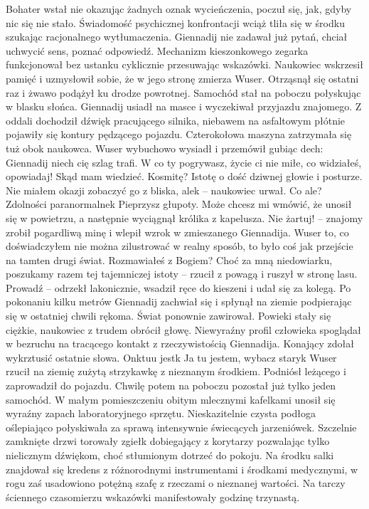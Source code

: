 \documentclass[../MAIN.tex]{subfiles}
\begin{document}
Bohater wstał nie okazując żadnych oznak wycieńczenia, poczuł się, jak, gdyby nic się nie stało. Świadomość psychicznej konfrontacji wciąż tliła się w środku szukając racjonalnego wytłumaczenia. Giennadij nie zadawał już pytań, chciał uchwycić sens, poznać odpowiedź. Mechanizm kieszonkowego zegarka funkcjonował bez ustanku cyklicznie przesuwając wskazówki. Naukowiec wskrzesił pamięć 
i uzmysłowił sobie, że w jego stronę zmierza Wuser. Otrząsnął się ostatni raz i żwawo podążył ku drodze powrotnej. Samochód stał na poboczu połyskując w blasku słońca. Giennadij usiadł na masce i wyczekiwał przyjazdu znajomego. Z oddali dochodził dźwięk pracującego silnika, niebawem na asfaltowym płótnie pojawiły się kontury pędzącego pojazdu. Czterokołowa maszyna zatrzymała się tuż obok naukowca. Wuser wybuchowo wysiadł i przemówił gubiąc dech:
% 
\sx Giennadij niech cię szlag trafi. W co ty pogrywasz, życie ci nie miłe, co widziałeś, opowiadaj! 
\xx Skąd mam wiedzieć. Kosmitę? Istotę o dość dziwnej głowie i posturze. Nie miałem okazji zobaczyć go z bliska, ale\3k -- naukowiec urwał. 
\xx Co ale? 
\xx Zdolności paranormalne\3k 
\xx Pieprzysz głupoty. Może chcesz mi wmówić, że unosił się w powietrzu, a następnie wyciągnął królika z kapelusza. Nie żartuj! -- znajomy zrobił pogardliwą minę i wlepił wzrok w zmieszanego Giennadija. 
\xx Wuser to, co doświadczyłem nie można zilustrować w realny sposób, to było coś jak przejście na tamten drugi świat. 
\xx Rozmawiałeś z Bogiem? 
\xx Choć za mną niedowiarku, poszukamy razem tej tajemniczej istoty -- rzucił z powagą i ruszył w stronę lasu. 
\xx Prowadź -- odrzekł lakonicznie, wsadził ręce do kieszeni i udał się za kolegą. 
Po pokonaniu kilku metrów Giennadij zachwiał się i spłynął na ziemie podpierając się w ostatniej chwili rękoma. Świat ponownie zawirował. Powieki stały się ciężkie, naukowiec z trudem obrócił głowę. Niewyraźny profil człowieka spoglądał w bezruchu na tracącego kontakt z rzeczywistością Giennadija. Konający zdołał wykrztusić ostatnie słowa. 
\xx On\3ktuu jest\3k 
\xx Ja tu jestem, wybacz stary\3k
\qd
Wuser rzucił na ziemię zużytą strzykawkę z nieznanym środkiem. Podniósł leżącego i zaprowadził do pojazdu. Chwilę potem na poboczu pozostał już tylko jeden samochód.
% 
% 
W małym pomieszczeniu obitym mlecznymi kafelkami unosił się wyraźny zapach laboratoryjnego sprzętu. Nieskazitelnie czysta podłoga oślepiająco połyskiwała za sprawą intensywnie świecących jarzeniówek. Szczelnie zamknięte drzwi torowały zgiełk dobiegający z korytarzy pozwalając tylko nielicznym dźwiękom, choć stłumionym dotrzeć do pokoju. Na środku salki znajdował się kredens z różnorodnymi instrumentami i środkami medycznymi, w rogu zaś usadowiono potężną szafę z rzeczami o nieznanej wartości. Na tarczy ściennego czasomierzu wskazówki manifestowały godzinę trzynastą. 
\end{document}
